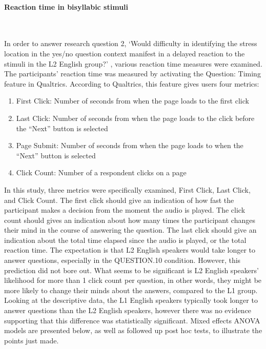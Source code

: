 \documentclass[a4paper]{article}
\begin{document}
\paragraph{Reaction time in bisyllabic stimuli} \

In order to answer research question 2, `Would difficulty in identifying the stress location in the yes/no question context manifest in a delayed reaction to the stimuli in the L2 English group?' , various reaction time measures were examined. The participants' reaction time was measured by activating the Question: Timing feature in Qualtrics. According to Qualtrics, this feature gives users four metrics:

\begin{enumerate}
\item First Click: Number of seconds from when the page loads to the first click 
\item Last Click: Number of seconds from when the page loads to the click before the “Next” button is selected 
\item Page Submit: Number of seconds from when the page loads to when the “Next” button is selected 
\item Click Count: Number of a respondent clicks on a page 
\end{enumerate}

In this study, three metrics were specifically examined, First Click, Last Click, and Click Count. The first click should give an indication of how fast the participant makes a decision from the moment the audio is played. The click count should gives an indication about how many times the participant changes their mind in the course of answering the question. The last click should give an indication about the total time elapsed since the audio is played, or the total reaction time. The expectation is that L2 English speakers would take longer to answer questions, especially in the QUESTION.10 condition. However, this prediction did not bore out. What seems to be significant is L2 English speakers' likelihood for more than 1 click count per question, in other words, they might be more likely to change their minds about the answers, compared to the L1 group. Looking at the descriptive data, the L1 English speakers typically took longer to answer questions than the L2 English speakers, however there was no evidence supporting that this difference was statistically significant. Mixed effects ANOVA models are presented below, as well as followed up post hoc tests, to illustrate the points just made.
\end{document}
